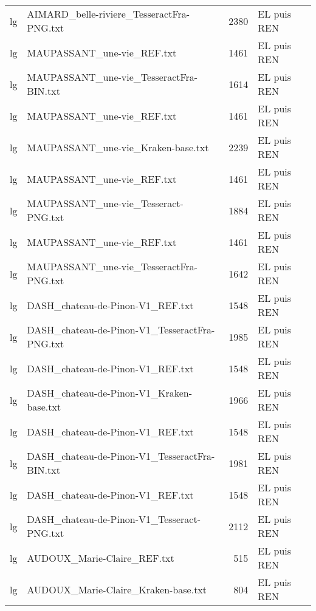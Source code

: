 \begin{tabular}{llrl}
    lg &          AIMARD\_belle-riviere\_TesseractFra-PNG.txt &                  2380 & EL puis REN \\
    lg &                         MAUPASSANT\_une-vie\_REF.txt &                  1461 & EL puis REN \\
    lg &            MAUPASSANT\_une-vie\_TesseractFra-BIN.txt &                  1614 & EL puis REN \\
    lg &                         MAUPASSANT\_une-vie\_REF.txt &                  1461 & EL puis REN \\
    lg &                 MAUPASSANT\_une-vie\_Kraken-base.txt &                  2239 & EL puis REN \\
    lg &                         MAUPASSANT\_une-vie\_REF.txt &                  1461 & EL puis REN \\
    lg &               MAUPASSANT\_une-vie\_Tesseract-PNG.txt &                  1884 & EL puis REN \\
    lg &                         MAUPASSANT\_une-vie\_REF.txt &                  1461 & EL puis REN \\
    lg &            MAUPASSANT\_une-vie\_TesseractFra-PNG.txt &                  1642 & EL puis REN \\
    lg &                   DASH\_chateau-de-Pinon-V1\_REF.txt &                  1548 & EL puis REN \\
    lg &      DASH\_chateau-de-Pinon-V1\_TesseractFra-PNG.txt &                  1985 & EL puis REN \\
    lg &                   DASH\_chateau-de-Pinon-V1\_REF.txt &                  1548 & EL puis REN \\
    lg &           DASH\_chateau-de-Pinon-V1\_Kraken-base.txt &                  1966 & EL puis REN \\
    lg &                   DASH\_chateau-de-Pinon-V1\_REF.txt &                  1548 & EL puis REN \\
    lg &      DASH\_chateau-de-Pinon-V1\_TesseractFra-BIN.txt &                  1981 & EL puis REN \\
    lg &                   DASH\_chateau-de-Pinon-V1\_REF.txt &                  1548 & EL puis REN \\
    lg &         DASH\_chateau-de-Pinon-V1\_Tesseract-PNG.txt &                  2112 & EL puis REN \\
    lg &                        AUDOUX\_Marie-Claire\_REF.txt &                   515 & EL puis REN \\
    lg &                AUDOUX\_Marie-Claire\_Kraken-base.txt &                   804 & EL puis REN \\

\end{tabular}
